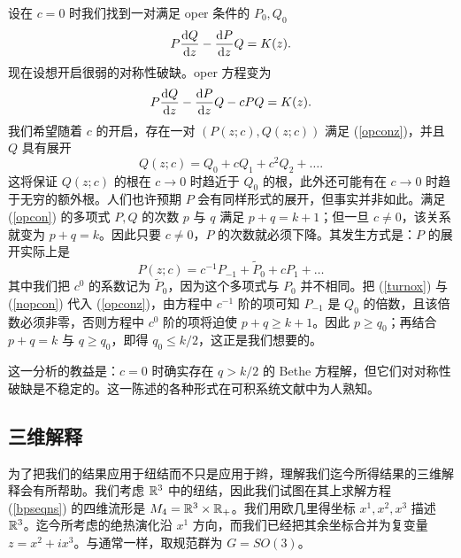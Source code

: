 设在 $c=0$ 时我们找到一对满足 oper 条件的 $P_0,Q_0$
\begin{equation}\label{opcon} P\frac{{\mathrm d} Q}{{\mathrm d} z}-\frac{{\mathrm d} P}{{\mathrm d} z}Q=K(z).\end{equation}
现在设想开启很弱的对称性破缺。oper 方程变为
\begin{equation}\label{opconz} P\frac{{\mathrm d} Q}{{\mathrm d} z}-\frac{{\mathrm d} P}{{\mathrm d} z}Q-cPQ=K(z).\end{equation}
我们希望随着 $c$ 的开启，存在一对 $(P(z;c),Q(z;c))$ 满足 (\ref{opconz})，并且 $Q$ 具有展开
\begin{equation}\label{turnox}Q(z;c)=Q_0+cQ_1+c^2Q_2+\dots.\end{equation}
这将保证 $Q(z;c)$ 的根在 $c\to 0$ 时趋近于 $Q_0$ 的根，此外还可能有在 $c\to 0$ 时趋于无穷的额外根。人们也许预期 $P$ 会有同样形式的展开，但事实并非如此。满足 (\ref{opcon}) 的多项式 $P,Q$ 的次数 $p$ 与 $q$ 满足 $p+q=k+1$；但一旦 $c\not=0$，该关系就变为 $p+q=k$。因此只要 $c\not=0$，$P$ 的次数就必须下降。其发生方式是：$P$ 的展开实际上是
\begin{equation}\label{nopcon}P(z;c)=c^{-1}P_{-1}+\tilde P_0 +c P_1+\dots\end{equation}
其中我们把 $c^0$ 的系数记为 $\tilde P_0$，因为这个多项式与 $P_0$ 并不相同。把 (\ref{turnox}) 与 (\ref{nopcon}) 代入 (\ref{opconz})，由方程中 $c^{-1}$ 阶的项可知 $P_{-1}$ 是 $Q_0$ 的倍数，且该倍数必须非零，否则方程中 $c^0$ 阶的项将迫使 $p+q\geq k+1$。因此 $p\geq q_0$；再结合 $p+q=k$ 与 $q\geq q_0$，即得 $q_0\leq k/2$，这正是我们想要的。


这一分析的教益是：$c=0$ 时确实存在 $q>k/2$ 的 Bethe 方程解，但它们对对称性破缺是不稳定的。这一陈述的各种形式在可积系统文献中为人熟知。

\subsection{三维解释}\label{abdesc}
为了把我们的结果应用于纽结而不只是应用于辫，理解我们迄今所得结果的三维解释会有所帮助。我们考虑 ${\mathbb R}^3$ 中的纽结，因此我们试图在其上求解方程 (\ref{bpseqns}) 的四维流形是 $M_4={\mathbb R}^3\times {\mathbb R}_+$。我们用欧几里得坐标 $x^1,x^2,x^3$ 描述 ${\mathbb R}^3$。迄今所考虑的绝热演化沿 $x^1$ 方向，而我们已经把其余坐标合并为复变量 $z=x^2+ix^3$。与通常一样，取规范群为 $G=SO(3)$。

